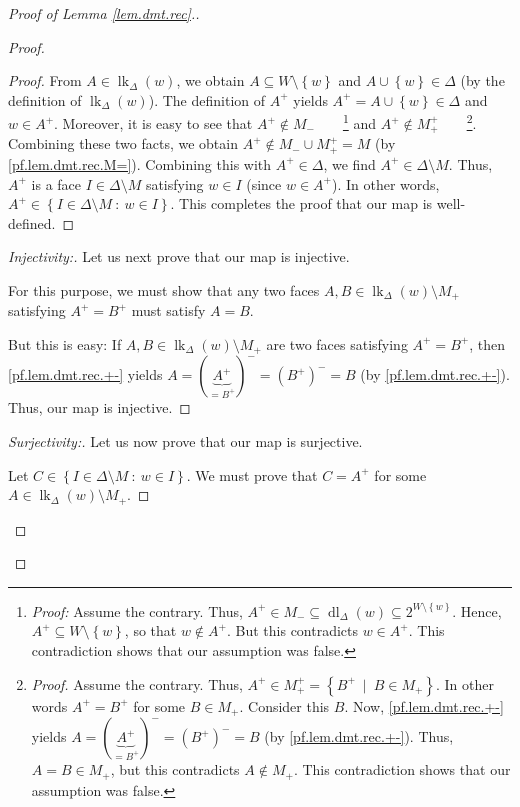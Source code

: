 \documentclass[12pt]{amsart}
\theoremstyle{definition}
\DeclareMathOperator{\lk}{lk}
\DeclareMathOperator{\dl}{dl}
\begin{document}
\begin{proof}[Proof of Lemma \ref{lem.dmt.rec}.]
\begin{proof}
\begin{proof}
From $A\in\lk_{\Delta}\left(  w\right)  $, we obtain
$A\subseteq W\setminus\left\{  w\right\}  $ and $A\cup\left\{  w\right\}
\in\Delta$ (by the definition of $\lk_{\Delta}\left(
w\right)  $). The definition of $A^+$ yields $A^+=A\cup\left\{  w\right\}
\in\Delta$ and $w\in A^+$. Moreover, it is easy to see that $A^+\notin
M_-$\ \ \ \ \footnote{\textit{Proof:} Assume the contrary. Thus, $A^+\in
M_-\subseteq\dl_{\Delta}\left(  w\right)
\subseteq2^{W\setminus\left\{  w\right\}  }$. Hence, $A^+\subseteq
W\setminus\left\{  w\right\}  $, so that $w\notin A^+$. But this contradicts
$w\in A^+$. This contradiction shows that our assumption was false.} and
$A^+\notin M_+^+$\ \ \ \ \footnote{\textit{Proof.} Assume the contrary.
Thus, $A^+\in M_+^+=\left\{  B^+\ \mid\ B\in M_+\right\}  $. In
other words $A^+=B^+$ for some $B\in M_+$. Consider this $B$. Now,
\eqref{pf.lem.dmt.rec.+-} yields $A=\left(  \underbrace{A^+}_{=B^+%
}\right)  ^-=\left(  B^+\right)  ^-=B$ (by \eqref{pf.lem.dmt.rec.+-}).
Thus, $A=B\in M_+$, but this contradicts $A\notin M_+$. This contradiction
shows that our assumption was false.}. Combining these two facts, we obtain
$A^+\notin M_-\cup M_+^+=M$ (by \eqref{pf.lem.dmt.rec.M=}). Combining
this with $A^+\in\Delta$, we find $A^+\in\Delta\setminus M$. Thus, $A^+$
is a face $I\in\Delta\setminus M$ satisfying $w\in I$ (since $w\in A^+$). In
other words, $A^+\in\left\{  I\in\Delta\setminus M\ :\ w\in I\right\}  $.
This completes the proof that our map is well-defined.
\end{proof}

\begin{proof}
[Injectivity:]Let us next prove that our map is injective.

For this purpose, we must show that any two faces
$A,B\in\lk_{\Delta}\left(  w\right)  \setminus M_+$ satisfying
$A^+=B^+$ must satisfy $A=B$.

But this is easy: If $A,B\in\lk_{\Delta}\left(
w\right)  \setminus M_+$ are two faces satisfying $A^+=B^+$, then
\eqref{pf.lem.dmt.rec.+-} yields $A=\left(  \underbrace{A^+}_{=B^+%
}\right)  ^-=\left(  B^+\right)  ^-=B$ (by \eqref{pf.lem.dmt.rec.+-}).
Thus, our map is injective.
\end{proof}

\begin{proof}
[Surjectivity:]Let us now prove that our map is surjective.

Let $C\in\left\{  I\in\Delta\setminus M\ :\ w\in I\right\}  $. We must prove
that $C=A^+$ for some $A\in\lk_{\Delta}\left(
w\right)  \setminus M_+$.


\end{proof}
\end{proof}
\end{proof}
\end{document}
